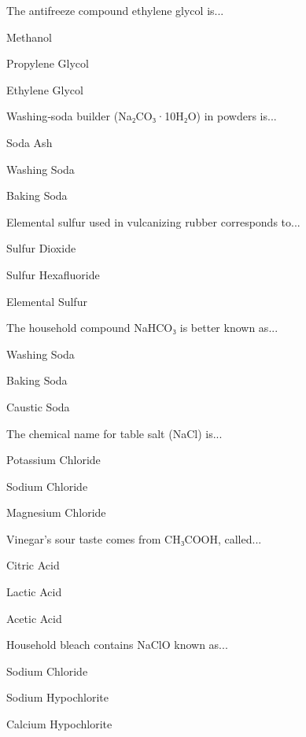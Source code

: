 \begin{enhancedmcq}{The antifreeze compound ethylene glycol is...}
\item Methanol
\item Propylene Glycol
\item Ethylene Glycol

\end{enhancedmcq}
\begin{enhancedmcq}{Washing‑soda builder (Na₂CO₃·10H₂O) in powders is...}
\item Soda Ash
\item Washing Soda
\item Baking Soda

\end{enhancedmcq}
\begin{enhancedmcq}{Elemental sulfur used in vulcanizing rubber corresponds to...}
\item Sulfur Dioxide
\item Sulfur Hexafluoride
\item Elemental Sulfur

\end{enhancedmcq}
\begin{enhancedmcq}{The household compound NaHCO₃ is better known as...}
\item Washing Soda
\item Baking Soda
\item Caustic Soda

\end{enhancedmcq}
\begin{enhancedmcq}{The chemical name for table salt (NaCl) is...}
\item Potassium Chloride
\item Sodium Chloride
\item Magnesium Chloride

\end{enhancedmcq}
\begin{enhancedmcq}{Vinegar's sour taste comes from CH₃COOH, called...}
\item Citric Acid
\item Lactic Acid
\item Acetic Acid

\end{enhancedmcq}
\begin{enhancedmcq}{Household bleach contains NaClO known as...}
\item Sodium Chloride
\item Sodium Hypochlorite
\item Calcium Hypochlorite

\end{enhancedmcq}
